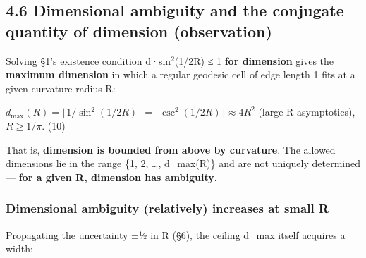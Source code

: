 \documentclass[
]{ltjsarticle}
\begin{document}
\subsection{4.6 Dimensional ambiguity and the conjugate quantity of
dimension
(observation)}\label{dimensional-ambiguity-and-the-conjugate-quantity-of-dimension-observation}

Solving §1's existence condition d·sin\(^{2}\)(1/2R) ≤ 1 \textbf{for
dimension} gives the \textbf{maximum dimension} in which a regular
geodesic cell of edge length 1 fits at a given curvature radius R:

\(d_{\max}(R) = \lfloor 1/\sin^2(1/2R)\rfloor = \lfloor \csc^2(1/2R)\rfloor \approx 4R^2\)
(large-R asymptotics), \(R \ge 1/\pi\). (10)

That is, \textbf{dimension is bounded from above by curvature}. The
allowed dimensions lie in the range \{1, 2, \ldots, d\_max(R)\} and are
not uniquely determined --- \textbf{for a given R, dimension has
ambiguity}.

\subsubsection{Dimensional ambiguity (relatively) increases at small
R}\label{dimensional-ambiguity-relatively-increases-at-small-r}

Propagating the uncertainty ±½ in R (§6), the ceiling d\_max itself
acquires a width:
\end{document}
